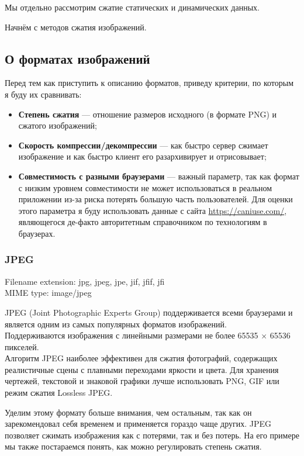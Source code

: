\documentclass[12pt]{article}
\begin{document}
Мы отдельно рассмотрим сжатие статических и динамических данных.

Начнём с методов сжатия изображений.

\subsection{О форматах изображений}

Перед тем как приступить к описанию форматов, приведу критерии, по которым я буду их сравнивать:

\begin{itemize}
    \item \textbf{Степень сжатия} — отношение размеров исходного (в формате PNG) и сжатого изображений;
    \item \textbf{Скорость компрессии/декомпрессии} — как быстро сервер сжимает изображение и как быстро клиент его разархивирует и отрисовывает;
    \item \textbf{Совместимость с разными браузерами} — важный параметр,
          так как формат с низким уровнем совместимости не может использоваться в реальном приложении
          из-за риска потерять большую часть пользователей. Для оценки этого параметра
          я буду использовать данные с сайта \url{https://caniuse.com/}, являющегося де-факто авторитетным справочником
          по технологиям в браузерах.
\end{itemize}

\subsubsection{JPEG}

Filename extension: jpg, jpeg, jpe, jif, jfif, jfi\\
MIME type: image/jpeg

JPEG (Joint Photographic Experts Group) поддерживается всеми браузерами
и является одним из самых популярных форматов изображений.\\
Поддерживаются изображения с линейными размерами не более 65535 × 65536 пикселей.\\

Алгоритм JPEG наиболее эффективен для сжатия фотографий, содержащих реалистичные сцены
с плавными переходами яркости и цвета. Для хранения чертежей, текстовой и знаковой
графики лучше использовать PNG, GIF
или режим сжатия Lossless JPEG.

Уделим этому формату больше внимания, чем остальным, так как он зарекомендовал себя временем
и применяется гораздо чаще других. JPEG позволяет сжимать изображения как с потерями,
так и без потерь.
На его примере мы также постараемся понять, как можно регулировать степень сжатия.
\end{document}
